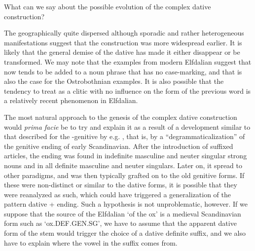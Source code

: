 
What can we say about the possible evolution of the complex dative construction? 


The geographically quite dispersed although sporadic and rather heterogeneous manifestations suggest that the construction was more widespread earlier. It is likely that the general demise of the dative has made it either disappear or be transformed. We may note that the examples from modern Elfdalian suggest that now tends to be added to a noun phrase that has no case-marking, and that is also the case for the Ostrobothnian examples. It is also possible that the tendency to treat  as a clitic with no influence on the form of the previous word is a relatively recent phenomenon in Elfdalian.  


The most natural approach to the genesis of the complex dative construction would \textit{prima facie} be to try and explain it as a result of a development similar to that described for the -genitive by e.g. \citet{Norde1997}, that is, by a “degrammaticalization” of the genitive ending of early Scandinavian. After the introduction of suffixed articles, the ending was found in indefinite masculine and neuter singular strong nouns and in all definite masculine and neuter singulars. Later on, it spread to other paradigms, and was then typically grafted on to the old genitive forms. If these were non-distinct or similar to the dative forms, it is possible that they were reanalyzed as such, which could have triggered a generalization of the pattern dative + ending. Such a hypothesis is not unproblematic, however. If we suppose that the source of the Elfdalian  ‘of the ox’ is a medieval Scandinavian form such as  ‘ox.DEF.GEN.SG’, we have to assume that the apparent dative form of the stem would trigger the choice of a dative definite suffix, and we also have to explain where the vowel in the suffix comes from. 

